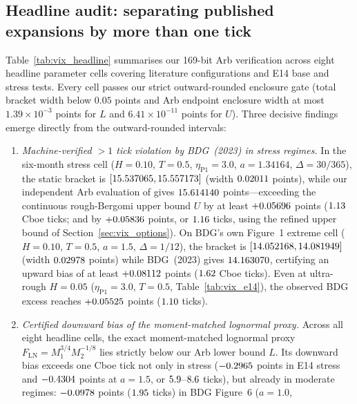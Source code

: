 \subsection{Headline \RoughCertTilt{} audit: separating published expansions by more than one tick}\label{sec:vix_headline}
Table~\ref{tab:vix_headline} summarises our 169-bit Arb \RoughCertTilt{} verification across eight headline parameter cells
covering literature configurations and E14 base and stress tests. Every cell passes our strict outward-rounded enclosure
gate (total bracket width below $0.05$ points and Arb endpoint enclosure width at most $1.39\times10^{-3}$ points
for $L$ and $6.41\times10^{-11}$ points for $U$). Three decisive findings emerge directly from the
outward-rounded intervals:
\begin{enumerate}
\item \emph{Machine-verified $>1$ tick violation by BDG~(2023) in stress regimes.} In the six-month
  stress cell ($H=0.10$, $T=0.5$, $\eta_{\mathrm{P1}}=3.0$, $a=1.34164$, $\Delta=30/365$), the static
  \RoughCertTilt{} bracket is $[15.537065,15.557173]$ (width $0.02011$ points), while
  our independent Arb evaluation of \citet[Theorem~2.2]{BourgeyDeMarcoGobet2023} gives $15.614140$
  points---exceeding the continuous rough-Bergomi upper bound $U$ by at least $+0.05696$ points
  ($1.13$ Cboe ticks; and by $+0.05836$ points, or $1.16$ ticks, using the refined \RoughCertCV{} upper bound
  of Section~\ref{sec:vix_options}). On BDG's own Figure~1 extreme cell ($H=0.10$, $T=0.5$,
  $a=1.5$, $\Delta=1/12$), the \RoughCertTilt{} bracket is $[14.052168,14.081949]$ (width $0.02978$
  points) while BDG~(2023) gives $14.163070$, certifying an upward bias of at least
  $+0.08112$ points ($1.62$ Cboe ticks). Even at ultra-rough $H=0.05$ ($\eta_{\mathrm{P1}}=3.0$,
  $T=0.5$, Table~\ref{tab:vix_e14}), the observed BDG excess reaches $+0.05525$ points
  ($1.10$ ticks).
\item \emph{Certified downward bias of the moment-matched lognormal proxy.} Across all eight headline
  cells, the exact moment-matched lognormal proxy $F_{\mathrm{LN}}=M_1^{3/4}M_2^{-1/8}$ lies strictly
  below our Arb lower bound $L$. Its downward bias exceeds one Cboe tick not only in stress
  ($-0.2965$ points in E14 stress and $-0.4304$ points at $a=1.5$, or $5.9$--$8.6$
  ticks), but already in moderate regimes: $-0.0978$ points ($1.95$ ticks) in BDG Figure~6 ($a=1.0$,

\end{enumerate}
